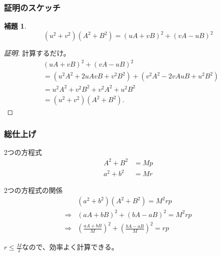 \documentclass[dvipdfmx,11pt,notheorems]{beamer}
\theoremstyle{definition}
\newtheorem{lemma}{補題}
\begin{document}
\begin{frame}\frametitle{証明のスケッチ}

\begin{lemma}
\begin{equation*}
(u^{2} + v^{2})(A^{2}+B^{2}) = (uA+vB)^{2} + (vA-uB)^{2}
\end{equation*}
\end{lemma}

\begin{proof}[証明]
計算するだけ。
\begin{equation*} 
\begin{split}
&(uA+vB)^{2} + (vA-uB)^{2}  \\
&= (u^{2}A^{2} + 2uAvB + v^{2}B^{2}) + (v^{2}A^{2}-2vAuB + u^{2}B^{2})  \\
 &= u^{2}A^{2}+v^{2}B^{2} + v^{2}A^{2}+u^{2}B^{2} \\
 &= (u^{2} + v^{2})(A^{2}+B^{2}).
 \end{split}
\end{equation*}

\end{proof}

\end{frame}


\begin{frame}[fragile]\frametitle{総仕上げ}
\begin{block}{2つの方程式}
\begin{align*}
A^{2} + B^{2} &= Mp \\
a^{2} + b^{2} &= Mr
\end{align*}
\end{block}

\begin{block}{2つの方程式の関係}
\begin{equation*} 
\begin{split}
            & (a^{2} + b^{2})(A^{2}+B^{2}) = M^{2}rp  \\
\Rightarrow & (aA + bB)^{2} + (bA - aB)^{2} = M^{2}rp \\
\Rightarrow & \left(\frac{aA + bB}{M}\right)^{2} + \left(\frac{bA - aB}{M}\right)^{2} = rp
 \end{split}
\end{equation*}
\end{block}

$\displaystyle r \leq \frac{M}{2}$なので、効率よく計算できる。

\end{frame}
\end{document}
